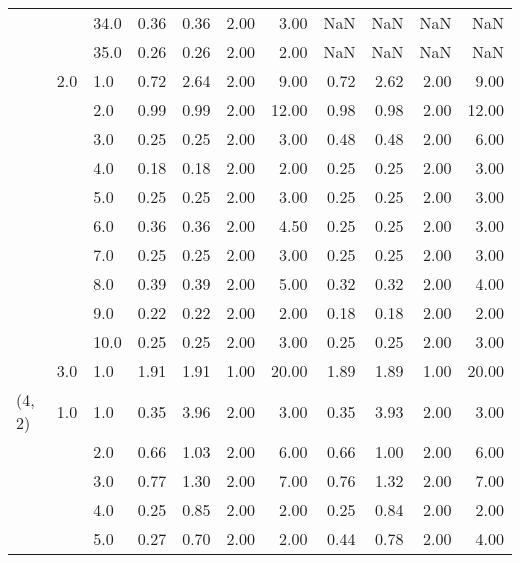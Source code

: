 \begin{tabular}{lllrrrrrrrr}
       &     & 34.0 &       0.36 &      0.36 & 2.00 &   3.00 &        NaN &       NaN &  NaN &    NaN \\
       &     & 35.0 &       0.26 &      0.26 & 2.00 &   2.00 &        NaN &       NaN &  NaN &    NaN \\
       & 2.0 & 1.0  &       0.72 &      2.64 & 2.00 &   9.00 &       0.72 &      2.62 & 2.00 &   9.00 \\
       &     & 2.0  &       0.99 &      0.99 & 2.00 &  12.00 &       0.98 &      0.98 & 2.00 &  12.00 \\
       &     & 3.0  &       0.25 &      0.25 & 2.00 &   3.00 &       0.48 &      0.48 & 2.00 &   6.00 \\
       &     & 4.0  &       0.18 &      0.18 & 2.00 &   2.00 &       0.25 &      0.25 & 2.00 &   3.00 \\
       &     & 5.0  &       0.25 &      0.25 & 2.00 &   3.00 &       0.25 &      0.25 & 2.00 &   3.00 \\
       &     & 6.0  &       0.36 &      0.36 & 2.00 &   4.50 &       0.25 &      0.25 & 2.00 &   3.00 \\
       &     & 7.0  &       0.25 &      0.25 & 2.00 &   3.00 &       0.25 &      0.25 & 2.00 &   3.00 \\
       &     & 8.0  &       0.39 &      0.39 & 2.00 &   5.00 &       0.32 &      0.32 & 2.00 &   4.00 \\
       &     & 9.0  &       0.22 &      0.22 & 2.00 &   2.00 &       0.18 &      0.18 & 2.00 &   2.00 \\
       &     & 10.0 &       0.25 &      0.25 & 2.00 &   3.00 &       0.25 &      0.25 & 2.00 &   3.00 \\
       & 3.0 & 1.0  &       1.91 &      1.91 & 1.00 &  20.00 &       1.89 &      1.89 & 1.00 &  20.00 \\
(4, 2) & 1.0 & 1.0  &       0.35 &      3.96 & 2.00 &   3.00 &       0.35 &      3.93 & 2.00 &   3.00 \\
       &     & 2.0  &       0.66 &      1.03 & 2.00 &   6.00 &       0.66 &      1.00 & 2.00 &   6.00 \\
       &     & 3.0  &       0.77 &      1.30 & 2.00 &   7.00 &       0.76 &      1.32 & 2.00 &   7.00 \\
       &     & 4.0  &       0.25 &      0.85 & 2.00 &   2.00 &       0.25 &      0.84 & 2.00 &   2.00 \\
       &     & 5.0  &       0.27 &      0.70 & 2.00 &   2.00 &       0.44 &      0.78 & 2.00 &   4.00 \\

\end{tabular}
